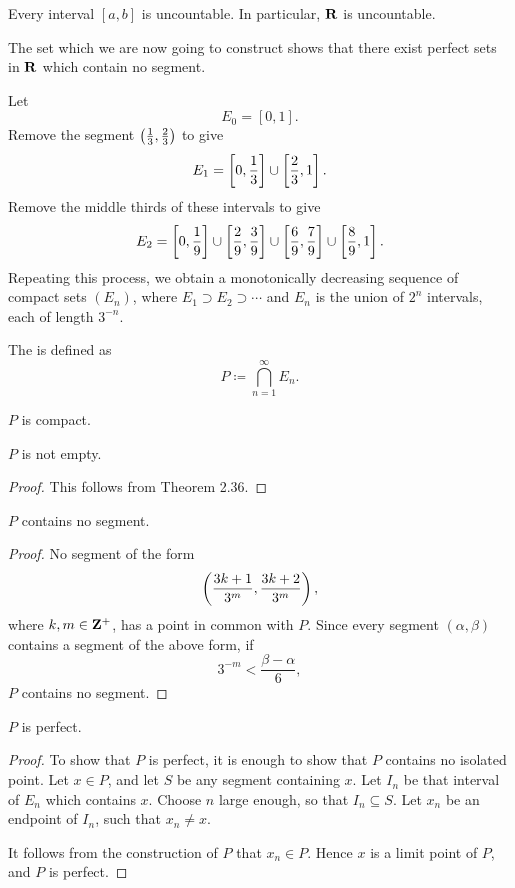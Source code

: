 \begin{corollary}
Every interval $[a,b]$ is uncountable. In particular, $\mathbf R$ is uncountable.
\end{corollary}

The set which we are now going to construct shows that there exist perfect sets in $\mathbf R$ which contain no segment.

Let
\[E_0=[0,1].\]
Remove the segment $\left(\frac{1}{3},\frac{2}{3}\right)$ to give
\[E_1=\left[0,\frac{1}{3}\right]\cup\left[\frac{2}{3},1\right].\]
Remove the middle thirds of these intervals to give
\[E_2=\left[0,\frac{1}{9}\right]\cup\left[\frac{2}{9},\frac{3}{9}\right]\cup\left[\frac{6}{9},\frac{7}{9}\right]\cup\left[\frac{8}{9},1\right].\]
Repeating this process, we obtain a monotonically decreasing sequence of compact sets $(E_n)$, where $E_1\supset E_2\supset\cdots$ and $E_n$ is the union of $2^n$ intervals, each of length $3^{-n}$.

The  is defined as
\[P\coloneqq\bigcap_{n=1}^{\infty}E_n.\]

\begin{proposition}
$P$ is compact.
\end{proposition}

\begin{proposition}
$P$ is not empty.
\end{proposition}

\begin{proof}
This follows from Theorem 2.36.
\end{proof}

\begin{proposition}
$P$ contains no segment.
\end{proposition}

\begin{proof}
No segment of the form
\[\left(\frac{3k+1}{3^m},\frac{3k+2}{3^m}\right),\]
where $k,m\in\mathbf Z^+$, has a point in common with $P$. Since every segment $(\alpha,\beta)$ contains a segment of the above form, if
\[3^{-m}<\frac{\beta-\alpha}{6},\]
$P$ contains no segment.
\end{proof}

\begin{proposition}
$P$ is perfect.
\end{proposition}

\begin{proof}
To show that $P$ is perfect, it is enough to show that $P$ contains no isolated point. Let $x\in P$, and let $S$ be any segment containing $x$. Let $I_n$ be that interval of $E_n$ which contains $x$. Choose $n$ large enough, so that $I_n\subseteq S$. Let $x_n$ be an endpoint of $I_n$, such that $x_n\neq x$.

It follows from the construction of $P$ that $x_n\in P$. Hence $x$ is a limit point of $P$, and $P$ is perfect.
\end{proof}
\pagebreak

